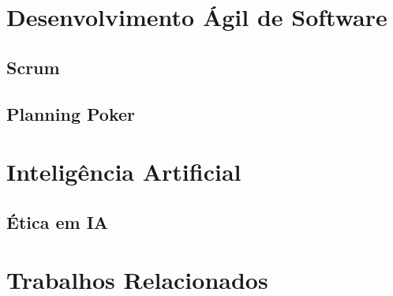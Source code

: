 \section{Desenvolvimento Ágil de Software}

\subsection{Scrum}

\subsection{Planning Poker}

\section{Inteligência Artificial}

\subsection{Ética em IA}


\section{Trabalhos Relacionados}
